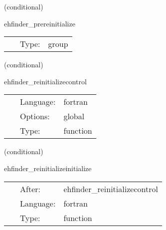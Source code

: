 \vspace{5mm}

\noindent {\bf }   (conditional) 

\hspace{5mm} ehfinder\_prereinitialize 

\hspace{5mm}{\it routines for re-initialization control } 


\hspace{5mm}

 \begin{tabular*}{160mm}{cll} 
~ & Type:  & group \\ 
\end{tabular*} 


\vspace{5mm}

   (conditional) 

\hspace{5mm} ehfinder\_reinitializecontrol 

\hspace{5mm}{\it initializes the re-initialization control } 


\hspace{5mm}

 \begin{tabular*}{160mm}{cll} 
~ & Language:  & fortran \\ 
~ & Options:  & global \\ 
~ & Type:  & function \\ 
\end{tabular*} 


\vspace{5mm}

   (conditional) 

\hspace{5mm} ehfinder\_reinitializeinitialize 

\hspace{5mm}{\it initializes variables for reinitialization } 


\hspace{5mm}

 \begin{tabular*}{160mm}{cll} 
~ & After:  & ehfinder\_reinitializecontrol \\ 
~ & Language:  & fortran \\ 
~ & Type:  & function \\ 
\end{tabular*} 


